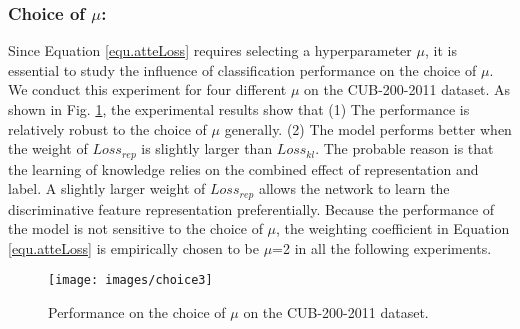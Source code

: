 \documentclass[5p,twocolumn]{elsarticle}
\begin{document}
\subsubsection{\textbf{Choice of $\mu$:}}
Since Equation \ref{equ.atteLoss} requires selecting a hyperparameter $\mu$, it is essential to study the influence of classification performance on the choice of $\mu$. We conduct this experiment for four different $\mu$ on the CUB-200-2011 dataset. As shown in Fig. \ref{fig:choiceu}, the experimental results show that (1) The performance is relatively robust to the choice of $\mu$ generally. (2) The model performs better when the weight of $Loss_{rep}$ is slightly larger than $Loss_{kl}$. The probable reason is that the learning of knowledge relies on the combined effect of representation and label. A slightly larger weight of $Loss_{rep}$  allows the network to learn the discriminative feature representation preferentially. Because the performance of the model is not sensitive to the choice of $\mu$, the weighting coefficient in Equation \ref{equ.atteLoss} is empirically chosen to be $\mu$=2 in all the following experiments.
 
\begin{figure}[h]
\centering
 \texttt{[image: images/choice3]}
  \caption{Performance on the choice of $\mu$ on the CUB-200-2011 dataset.}
  \label{fig:choiceu}
\end{figure}
\end{document}
